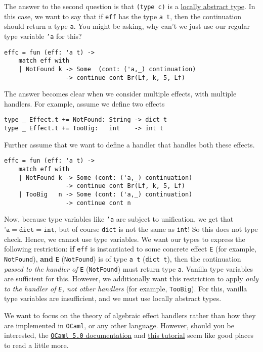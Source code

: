 The answer to the second question is that \texttt{(type c)} is a \href{https://ocaml.org/manual/5.2/locallyabstract.html}{locally abstract type}. In this case, we want to say that if \texttt{eff} has the type \texttt{a t}, then the continuation should return a type \texttt{a}. You might be asking, why can't we just use our regular type variable \texttt{'a} for this?
\begin{verbatim}
effc = fun (eff: 'a t) ->
    match eff with
    | NotFound k -> Some  (cont: ('a,_) continuation) 
                 -> continue cont Br(Lf, k, 5, Lf)
\end{verbatim}
The answer becomes clear when we consider multiple effects, with multiple handlers. For example, assume we define two effects
\begin{verbatim}
type _ Effect.t += NotFound: String -> dict t
type _ Effect.t += TooBig:   int    -> int t
\end{verbatim}
Further assume that we want to define a handler that handles both these effects.
\begin{verbatim}
effc = fun (eff: 'a t) ->
    match eff with
    | NotFound k -> Some (cont: ('a,_) continuation) 
                 -> continue cont Br(Lf, k, 5, Lf)
    | TooBig   n -> Some (cont: ('a,_) continuation) 
                 -> continue cont n
\end{verbatim}
Now, because type variables like \texttt{'a} are subject to unification, we get that $\texttt{'a} = \texttt{dict} = \texttt{int}$, but of course \texttt{dict} is not the same as \texttt{int}! So this does not type check. Hence, we cannot use type variables. We want our types to express the following restriction: \textbf{if} \texttt{eff} is instantiated to some concrete effect \texttt{E} (for example, \texttt{NotFound}), \textbf{and} \texttt{E} (\texttt{NotFound}) is of type \texttt{a t} (\texttt{dict t}), then the continuation \textit{passed to the handler of} \texttt{E} (\texttt{NotFound}) must return type \texttt{a}. Vanilla type variables are sufficient for this. However, we additionally want this restriction to apply \textit{only to the handler of \texttt{E}, not other handlers} (for example, \texttt{TooBig}). For this, vanilla type variables are insufficient, and we must use locally abstract types. 

We want to focus on the theory of algebraic effect handlers rather than how they are implemented in \texttt{OCaml}, or any other language. However, should you be interested, the \href{https://ocaml.org/manual/5.0/effects.html}{\texttt{OCaml 5.0} documentation} and \href{https://github.com/tanelso2/ocaml-effects-tutorial?tab=readme-ov-file}{this tutorial} seem like good places to read a little more. 

